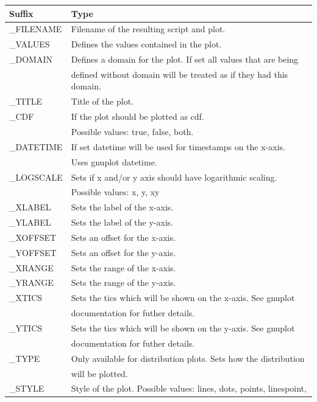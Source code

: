 \begin{table}[hp]
\centering
\begin{tabular}[h]{|l|l|}\hline
	\textbf{Suffix} & \textbf{Type}\\
	\hline
	{\_}FILENAME & Filename of the resulting script and plot.\\
	\hline
	{\_}VALUES & Defines the values contained in the plot.\\
	\hline
	{\_}DOMAIN & Defines a domain for the plot. If set all values that are being\\
	& defined without domain will be treated as if they had this domain.\\
	\hline
	{\_}TITLE & Title of the plot.\\
	\hline
	{\_}CDF & If the plot should be plotted as cdf.\\
	& Possible values: true, false, both.\\
	\hline
	{\_}DATETIME & If set datetime will be used for timestamps on the x-axis.\\
	& Uses gnuplot datetime.\\
	\hline	
	{\_}LOGSCALE & Sets if x and/or y axis should have logarithmic scaling.\\
	& Possible values: x, y, xy\\
	\hline
	{\_}XLABEL & Sets the label of the x-axis.\\
	\hline
	{\_}YLABEL & Sets the label of the y-axis.\\
	\hline
	{\_}XOFFSET & Sets an offset for the x-axis.\\
	\hline
	{\_}YOFFSET & Sets an offset for the y-axis.\\
	\hline
	{\_}XRANGE & Sets the range of the x-axis.\\
	\hline
	{\_}YRANGE & Sets the range of the y-axis.\\
	\hline
	{\_}XTICS & Sets the tics which will be shown on the x-axis. See gnuplot\\
	& documentation for futher details.\\
	\hline
	{\_}YTICS & Sets the tics which will be shown on the y-axis. See gnuplot\\
	& documentation for futher details.\\
	\hline
	{\_}TYPE & Only available for distribution plots. Sets how the distribution \\
	& will be plotted.\\
	\hline
	{\_}STYLE & Style of the plot. Possible values: lines, dots, points, linespoint,\\

\end{tabular}
\end{table}
